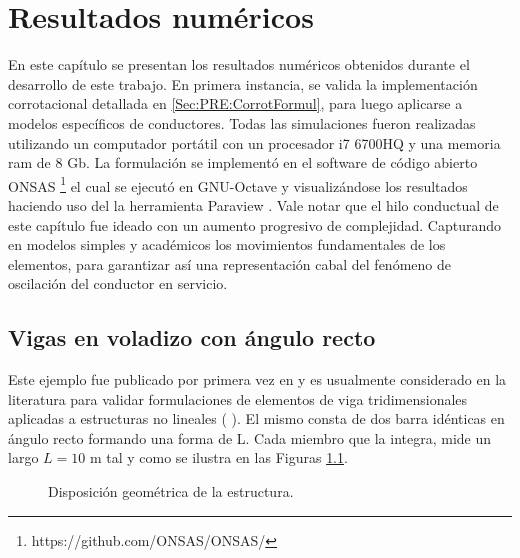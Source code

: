 \chapter{Resultados numéricos}\label{Cap:ResultadosNumericos}
\linenumbers
En este capítulo se presentan los resultados numéricos obtenidos durante el desarrollo de este trabajo. En primera instancia,  se valida la implementación corrotacional detallada en \ref{Sec:PRE:CorrotFormul}, para luego aplicarse a modelos específicos de conductores. Todas las simulaciones fueron realizadas utilizando un computador portátil con un procesador i7 6700HQ y una memoria ram de 8 Gb. La formulación se implementó en el software de código abierto ONSAS \footnote{https://github.com/ONSAS/ONSAS/} el cual se ejecutó en GNU-Octave  \textcite{Octave}y visualizándose los resultados haciendo uso del la herramienta Paraview \textcite{squillacote2007paraview}. Vale notar que el hilo conductual de este capítulo fue ideado con un aumento progresivo de complejidad. Capturando en modelos simples y académicos los movimientos fundamentales de los elementos, para garantizar así una representación cabal del fenómeno de oscilación del conductor en servicio. 


\section{Vigas en voladizo con ángulo recto}\label{Sec:RN:RightAngle}
Este ejemplo fue publicado por primera vez en \cite{simo1988dynamics} y es usualmente considerado en la literatura para validar formulaciones de elementos de viga tridimensionales aplicadas a estructuras no lineales (\cite{albino2018co} \cite{Le2014}). El mismo consta de dos barra idénticas en ángulo recto formando una forma de L. Cada miembro que la integra, mide un largo $L=10$ m tal y como se ilustra en las Figuras \ref{fig:RN:RA:esquemas}.


\begingroup
\centering
\begin{figure}[htbp]
	\centering
	\label{fig:RN:RA:Ilusxy}
	\label{fig:RN:RA:Ilusyz}
	\caption{Disposición geométrica de la estructura.} 	\label{fig:RN:RA:esquemas}
\end{figure}
\endgroup



